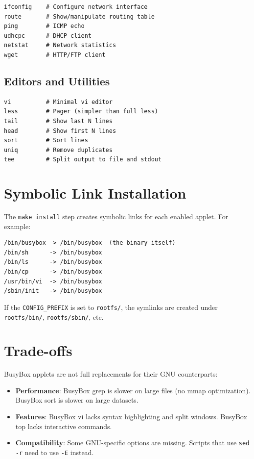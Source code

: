 \begin{lstlisting}
ifconfig    # Configure network interface
route       # Show/manipulate routing table
ping        # ICMP echo
udhcpc      # DHCP client
netstat     # Network statistics
wget        # HTTP/FTP client
\end{lstlisting}

\subsection{Editors and Utilities}

\begin{lstlisting}
vi          # Minimal vi editor
less        # Pager (simpler than full less)
tail        # Show last N lines
head        # Show first N lines
sort        # Sort lines
uniq        # Remove duplicates
tee         # Split output to file and stdout
\end{lstlisting}

\section{Symbolic Link Installation}

The \texttt{make install} step creates symbolic links for each enabled
applet. For example:

\begin{lstlisting}
/bin/busybox -> /bin/busybox  (the binary itself)
/bin/sh      -> /bin/busybox
/bin/ls      -> /bin/busybox
/bin/cp      -> /bin/busybox
/usr/bin/vi  -> /bin/busybox
/sbin/init   -> /bin/busybox
\end{lstlisting}

If the \texttt{CONFIG\_PREFIX} is set to \texttt{rootfs/}, the symlinks
are created under \texttt{rootfs/bin/}, \texttt{rootfs/sbin/}, etc.

\section{Trade-offs}

BusyBox applets are not full replacements for their GNU counterparts:

\begin{itemize}[nosep]
  \item \textbf{Performance}: BusyBox grep is slower on large files
        (no mmap optimization). BusyBox sort is slower on large datasets.
  \item \textbf{Features}: BusyBox vi lacks syntax highlighting and
        split windows. BusyBox top lacks interactive commands.
  \item \textbf{Compatibility}: Some GNU-specific options are missing.
        Scripts that use \texttt{sed -r} need to use \texttt{-E} instead.
\end{itemize}

